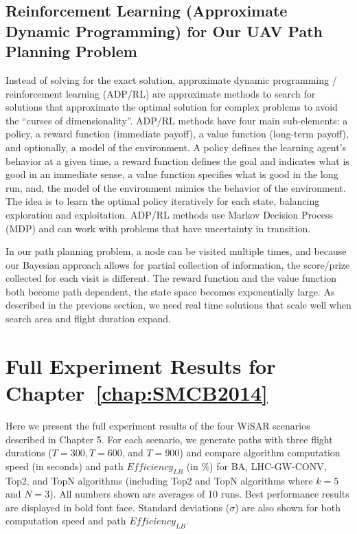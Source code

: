 \section{Reinforcement Learning (Approximate Dynamic Programming) for Our UAV Path Planning Problem}
\label{RLUAV}

Instead of solving for the exact solution, approximate dynamic programming / reinforcement learning (ADP/RL) are approximate methods to search for solutions that approximate the optimal solution for complex problems to avoid the ``curses of dimensionality''. ADP/RL methods have four main sub-elements: a policy, a reward function (immediate payoff), a value function (long-term payoff), and optionally, a model of the environment. A policy defines the learning agent's behavior at a given time, a reward function defines the goal and indicates what is good in an immediate sense, a value function specifies what is good in the long run, and, the model of the environment mimics the behavior of the environment. The idea is to learn the optimal policy iteratively for each state, balancing exploration and exploitation. ADP/RL methods use Markov Decision Process (MDP) and can work with problems that have uncertainty in transition.

In our path planning problem, a node can be visited multiple times, and because our Bayesian approach allows for partial collection of information, the score/prize collected for each visit is different. The reward function and the value function both become path dependent, the state space becomes exponentially large. As described in the previous section, we need real time solutions that scale well when search area and flight duration expand.

\chapter{Full Experiment Results for Chapter~\ref{chap:SMCB2014}}
\label{chap:result}

Here we present the full experiment results of the four WiSAR scenarios described in Chapter 5. For each scenario, we generate paths with three flight durations ($T=300, T=600$, and $T=900$) and compare algorithm computation speed (in seconds) and path $\mathit{Efficiency_{LB}}$ (in \%) for BA, LHC-GW-CONV, Top2, and TopN algorithms (including Top2 and TopN algorithms where $k=5$ and $N=3$). All numbers shown are averages of 10 runs. Best performance results are displayed in bold font face. Standard deviations ($\sigma$) are also shown for both computation speed and path $\mathit{Efficiency_{LB}}$.

